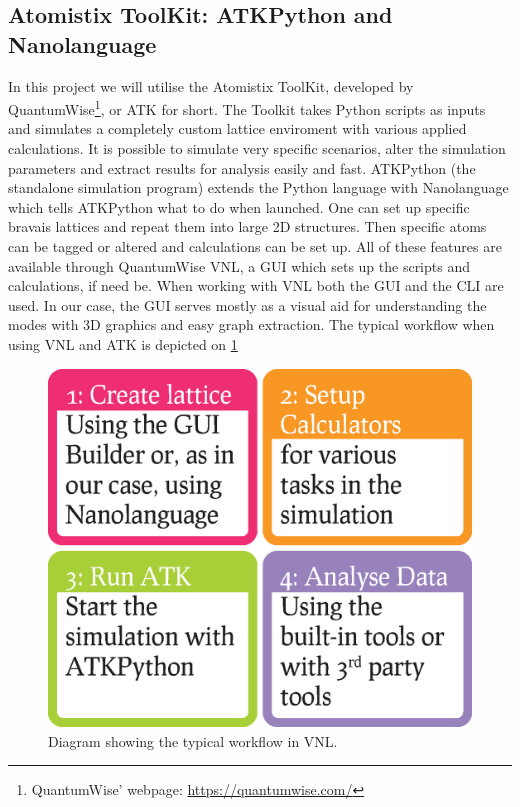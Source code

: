 
\subsection{Atomistix ToolKit: ATKPython and Nanolanguage}
In this project we will utilise the Atomistix ToolKit, developed by QuantumWise\footnote{QuantumWise' webpage: \href{https://quantumwise.com/}{https://quantumwise.com/}}, or ATK for short. The Toolkit takes Python scripts as inputs and simulates a completely custom lattice enviroment with various applied calculations. It is possible to simulate very specific scenarios, alter the simulation parameters and extract results for analysis easily and fast.
ATKPython (the standalone simulation program) extends the Python language with Nanolanguage which tells ATKPython what to do when launched. One can set up specific bravais lattices and repeat them into large 2D structures. Then specific atoms can be tagged or altered and calculations can be set up. All of these features are available through QuantumWise VNL, a GUI which sets up the scripts and calculations, if need be. When working with VNL both the GUI and the CLI are used. In our case, the GUI serves mostly as a visual aid for understanding the modes with 3D graphics and easy graph extraction. The typical workflow when using VNL and ATK is depicted on \cref{workflow}
\begin{figure}
  \centering
  \includegraphics[width=\columnwidth]{Figures/Workflow.eps}
  \caption{Diagram showing the typical workflow in VNL.}
  \label{workflow}
\end{figure}
